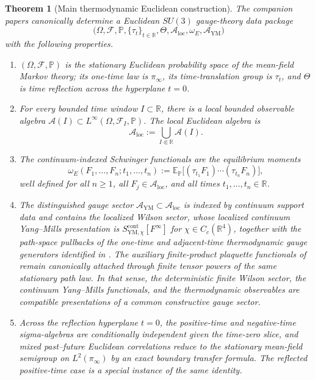 \documentclass[11pt]{article}
\newtheorem{theorem}{Theorem}[section]
\theoremstyle{definition}
\theoremstyle{remark}
\newcommand{\R}{\mathbb R}
\newcommand{\E}{\mathbb E}
\newcommand{\mcA}{\mathcal A}
\newcommand{\mcF}{\mathcal F}
\begin{document}
\begin{theorem}[Main thermodynamic Euclidean construction]
\label{thm:main}
The companion papers canonically determine a Euclidean \(SU(3)\) gauge-theory
data package
\[
\bigl(\Omega,\mcF,\mathbb P,\{\tau_t\}_{t\in\R},\Theta,\mcA_{\mathrm{loc}},
\omega_E,\mcA_{\mathrm{YM}}\bigr)
\]
with the following properties.
\begin{enumerate}[label=\textnormal{(\roman*)},leftmargin=1.5em]
\item \((\Omega,\mcF,\mathbb P)\) is the stationary Euclidean probability space
of the mean-field Markov theory; its one-time law is \(\pi_\infty\), its
time-translation group is \(\tau_t\), and \(\Theta\) is time reflection across
the hyperplane \(t=0\).
\item For every bounded time window \(I\subset\R\), there is a local bounded
observable algebra \(\mcA(I)\subset L^\infty(\Omega,\mcF_I,\mathbb P)\).  The
local Euclidean algebra is
\[
\mcA_{\mathrm{loc}}:=\bigcup_{I\Subset\R}\mcA(I).
\]
\item The continuum-indexed Schwinger functionals are the equilibrium moments
\[
\omega_E(F_1,\dots,F_n;t_1,\dots,t_n)
:=
\E_{\mathbb P}\!\bigl[(\tau_{t_1}F_1)\cdots(\tau_{t_n}F_n)\bigr],
\]
well defined for all \(n\ge1\), all \(F_j\in\mcA_{\mathrm{loc}}\), and all
times \(t_1,\dots,t_n\in\R\).
\item The distinguished gauge sector \(\mcA_{\mathrm{YM}}\subset\mcA_{\mathrm{loc}}\)
is indexed by continuum support data and contains the localized Wilson sector,
whose localized continuum Yang--Mills presentation is
\(S_{\mathrm{YM},\chi}^{\mathrm{cont}}[F^\infty]\) for
\(\chi\in C_c(\R^4)\), together with the path-space pullbacks of the one-time
and adjacent-time thermodynamic gauge generators identified in
\cite{continuumqft}.  The auxiliary finite-product plaquette functionals of
\cite{continuumqft} remain canonically attached through finite tensor powers of
the same stationary path law.  In that sense, the deterministic finite Wilson
sector, the continuum Yang--Mills functionals, and the thermodynamic
observables are compatible presentations of a common constructive gauge sector.
\item Across the reflection hyperplane \(t=0\), the positive-time and
negative-time sigma-algebras are conditionally independent given the time-zero
slice, and mixed past--future Euclidean correlations reduce to the stationary
mean-field semigroup on \(L^2(\pi_\infty)\) by an exact boundary transfer
formula.  The reflected positive-time case is a special instance of the same
identity.
\end{enumerate}
\end{theorem}
\end{document}
